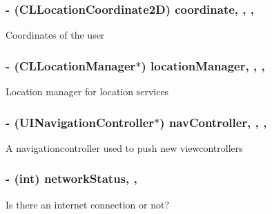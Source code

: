 \subsubsection[{coordinate}]{\setlength{\rightskip}{0pt plus 5cm}-\/ (C\+L\+Location\+Coordinate2\+D) coordinate\hspace{0.3cm}{\ttfamily [read]}, {\ttfamily [write]}, {\ttfamily [nonatomic]}, {\ttfamily [assign]}}\label{interface_app_delegate_a9fd0ff1892f8d79580c105c42cb1edfb}
Coordinates of the user \hypertarget{interface_app_delegate_a761a4fca92616724f55df0d8829df7c9}{}
\subsubsection[{location\+Manager}]{\setlength{\rightskip}{0pt plus 5cm}-\/ (C\+L\+Location\+Manager$\ast$) location\+Manager\hspace{0.3cm}{\ttfamily [read]}, {\ttfamily [write]}, {\ttfamily [nonatomic]}, {\ttfamily [strong]}}\label{interface_app_delegate_a761a4fca92616724f55df0d8829df7c9}
Location manager for location services \hypertarget{interface_app_delegate_aa193a8a903d646e7f4df993eacdb2c95}{}
\subsubsection[{nav\+Controller}]{\setlength{\rightskip}{0pt plus 5cm}-\/ (U\+I\+Navigation\+Controller$\ast$) nav\+Controller\hspace{0.3cm}{\ttfamily [read]}, {\ttfamily [write]}, {\ttfamily [nonatomic]}, {\ttfamily [strong]}}\label{interface_app_delegate_aa193a8a903d646e7f4df993eacdb2c95}
A navigationcontroller used to push new viewcontrollers \hypertarget{interface_app_delegate_a5def8217f43263a9cc1a6580263de05a}{}
\subsubsection[{network\+Status}]{\setlength{\rightskip}{0pt plus 5cm}-\/ (int) network\+Status\hspace{0.3cm}{\ttfamily [read]}, {\ttfamily [nonatomic]}, {\ttfamily [assign]}}\label{interface_app_delegate_a5def8217f43263a9cc1a6580263de05a}
Is there an internet connection or not? \hypertarget{interface_app_delegate_aceb81bd51dcec8876bf7794fe8aba74f}{}
